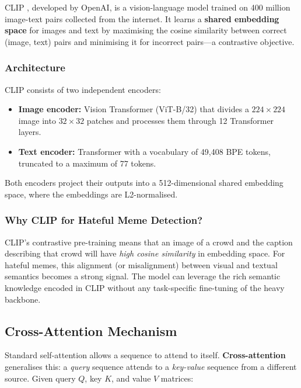 \documentclass[12pt,a4paper]{article}
\begin{document}
CLIP \cite{radford2021clip}, developed by OpenAI, is a vision-language model trained on 400 million image-text pairs collected from the internet. It learns a \textbf{shared embedding space} for images and text by maximising the cosine similarity between correct (image, text) pairs and minimising it for incorrect pairs---a contrastive objective.

\subsubsection{Architecture}

CLIP consists of two independent encoders:
\begin{itemize}
  \item \textbf{Image encoder:} Vision Transformer (ViT-B/32) that divides a $224 \times 224$ image into $32 \times 32$ patches and processes them through 12 Transformer layers.
  \item \textbf{Text encoder:} Transformer with a vocabulary of 49,408 BPE tokens, truncated to a maximum of 77 tokens.
\end{itemize}

Both encoders project their outputs into a 512-dimensional shared embedding space, where the embeddings are L2-normalised.

\subsubsection{Why CLIP for Hateful Meme Detection?}

\begin{tcolorbox}[highlight, title={Intuition}]
  CLIP's contrastive pre-training means that an image of a crowd and the caption describing that crowd will have \textit{high cosine similarity} in embedding space. For hateful memes, this alignment (or misalignment) between visual and textual semantics becomes a strong signal. The model can leverage the rich semantic knowledge encoded in CLIP without any task-specific fine-tuning of the heavy backbone.
\end{tcolorbox}

\subsection{Cross-Attention Mechanism}

Standard self-attention allows a sequence to attend to itself. \textbf{Cross-attention} generalises this: a \textit{query} sequence attends to a \textit{key-value} sequence from a different source. Given query $Q$, key $K$, and value $V$ matrices:
\end{document}
